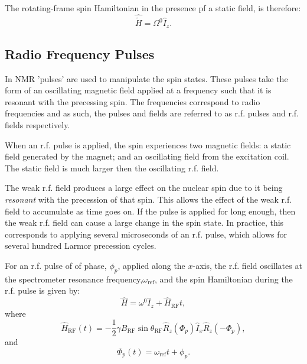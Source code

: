 The rotating-frame spin Hamiltonian in the presence pf a static field, is therefore:
\begin{equation}
  \hat{\tilde{H}} = \Omega^0\hat{I}_z.
\end{equation}

\subsection{Radio Frequency Pulses}

In NMR 'pulses' are used to manipulate the spin states. These pulses take the form
of an oscillating magnetic field applied at a frequency such that it is resonant with
the precessing spin. The frequencies correspond to radio frequencies and as such, the pulses and
fields are referred to as r.f. pulses and r.f. fields respectively.

When an r.f. pulse is applied, the spin experiences two magnetic fields: a static field generated
by the magnet; and an oscillating field from the excitation coil. The static field is much larger
then the oscillating r.f. field.

The weak r.f. field produces a large effect on the nuclear spin due to it being \textit{resonant}
with the precession of that spin. This allows the effect of the weak r.f. field to accumulate
as time goes on. If the pulse is applied for long enough, then the weak r.f. field can cause a
large change in the spin state. In practice, this corresponds to applying several microseconds
of an r.f. pulse, which allows for several hundred Larmor precession cycles.

For an r.f. pulse of of phase, $\phi_p$, applied along the $x$-axis, the r.f. field oscillates at the spectrometer resonance frequency,$\omega_{\text{ref}}$, and  the spin Hamiltonian
during the r.f. pulse is given by:
\begin{equation}
  \hat{H} = \omega^0\hat{I}_z + \hat{H}_{\text{RF}}{t},
\end{equation}
where
\begin{equation}
  \hat{H}_{\text{RF}}(t) = -\frac{1}{2}\gamma{B_{\text{RF}}}\sin{\theta_{\text{RF}}}\hat{R}_z(\Phi_p)\hat{I}_x\hat{R}_z(-\Phi_p),
\end{equation}
and
\begin{equation}
  \Phi_p(t) = \omega_{\text{ref}}t + \phi_p.
\end{equation}

